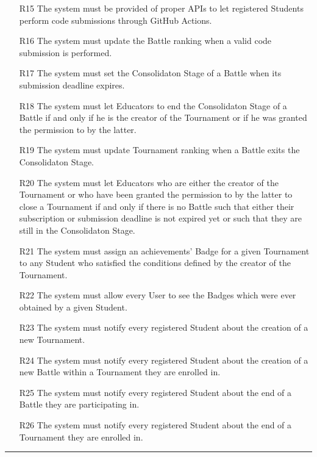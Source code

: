 \documentclass{Configuration_Files/Template}
\begin{document}
\begin{enumerate}
    \item[\textcolor{bluepoli}{R15}] The system must be provided of proper APIs to let registered Students perform code submissions through GitHub Actions.
    \item[\textcolor{bluepoli}{R16}] The system must update the Battle ranking when a valid code submission is performed.
    \item[\textcolor{bluepoli}{R17}] The system must set the Consolidaton Stage of a Battle when its submission deadline expires.
    \item[\textcolor{bluepoli}{R18}] The system must let Educators to end the Consolidaton Stage of a Battle if and only if he is the creator of the Tournament or if he was granted the permission to by the latter.
    \item[\textcolor{bluepoli}{R19}] The system must update Tournament ranking when a Battle exits the Consolidaton Stage.
    \item[\textcolor{bluepoli}{R20}] The system must let Educators who are either the creator of the Tournament or who have been granted the permission to by the latter to close a Tournament if and only if there is no Battle such that either their subscription or submission deadline is not expired yet or such that they are still in the Consolidaton Stage.
    \item[\textcolor{bluepoli}{R21}] The system must assign an achievements’ Badge for a given Tournament to any Student who satisfied the conditions defined by the creator of the Tournament.
    \item[\textcolor{bluepoli}{R22}] The system must allow every User to see the Badges which were ever obtained by a given Student.
    \item[\textcolor{bluepoli}{R23}] The system must notify every registered Student about the creation of a new Tournament.
    \item[\textcolor{bluepoli}{R24}] The system must notify every registered Student about the creation of a new Battle within a Tournament they are enrolled in.
    \item[\textcolor{bluepoli}{R25}] The system must notify every registered Student about the end of a Battle they are participating in.
    \item[\textcolor{bluepoli}{R26}] The system must notify every registered Student about the end of a Tournament they are enrolled in.
\end{enumerate}

{\color{bluepoli}\rule{\linewidth}{0.1pt}}
\end{document}
